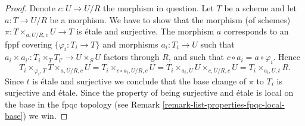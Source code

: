 \documentclass[10pt,a4paper]{amsart}
\theoremstyle{plain}
\theoremstyle{definition}
\theoremstyle{remark}
\numberwithin{equation}{subsection}
\begin{document}
\begin{proof}
Denote $c : U \to U/R$ the morphism in question.
Let $T$ be a scheme and let $a : T \to U/R$ be a morphism.
We have to show that the morphism (of schemes)
$\pi : T \times_{a, U/R, c} U \to T$ is \'etale and surjective.
The morphism $a$ corresponds to an fppf covering
$\{\varphi_i : T_i \to T\}$ and morphisms $a_i : T_i \to U$ such
that
$a_i \times a_{i'} : T_i \times_T T_{i'} \to U \times_S U$
factors through $R$, and such that $c \circ a_i = a \circ \varphi_i$.
Hence
$$
T_i \times_{\varphi_i, T} T \times_{a, U/R, c} U =
T_i \times_{c \circ a_i, U/R, c} U =
T_i \times_{a_i, U} U \times_{c, U/R, c} U = T_i \times_{a_i, U, t} R.
$$
Since $t$ is \'etale and surjective we conclude that
the base change of $\pi$ to $T_i$ is surjective and \'etale.
Since the property of being surjective and \'etale is local
on the base in the fpqc topology (see
Remark \ref{remark-list-properties-fpqc-local-base})
we win.
\end{proof}
\end{document}
